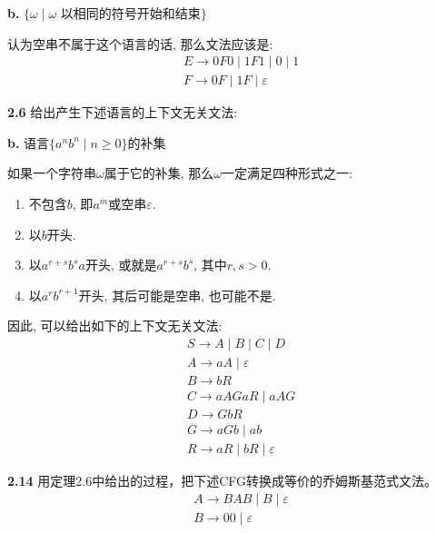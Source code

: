 \documentclass[UTF8]{report}
\newcommand{\problem}[1]{{\setlength{\parskip}{10pt}\noindent \bf{#1}}}
\newenvironment{solution}{{\noindent\hskip 2em \bf 解 \quad}}{}
\begin{document}
\problem{b.} $\{ \omega \mid \omega\text{ 以相同的符号开始和结束}\}$

\begin{solution}
    认为空串不属于这个语言的话, 那么文法应该是:
    \begin{align*}
        &E \rightarrow 0F0       \mid 1F1 \mid 0 \mid 1\\
        &F \rightarrow 0F \mid 1F \mid \varepsilon
    \end{align*}
\end{solution}

\problem{2.6} 给出产生下述语言的上下文无关文法:

\problem{b.} 语言$\{a^n b^n \mid n\geq 0\}$的补集

\begin{solution}
    如果一个字符串$\omega$属于它的补集, 那么$\omega$一定满足四种形式之一:
    \begin{enumerate}
        \item 不包含$b$, 即$a^m$或空串$\varepsilon$.
        \item 以$b$开头.
        \item 以$a^{r+s}b^sa$开头, 或就是$a^{r+s}b^s$, 其中$r,s>0$.
        \item 以$a^rb^{r+1}$开头, 其后可能是空串, 也可能不是.
    \end{enumerate}
    因此, 可以给出如下的上下文无关文法:
    \begin{align*}
        &S \rightarrow A\mid B\mid C\mid D\\
        &A \rightarrow aA \mid \varepsilon\\
        &B \rightarrow bR\\
        &C \rightarrow aAGaR \mid aAG\\
        &D \rightarrow GbR\\
        &G \rightarrow aGb \mid ab\\
        &R \rightarrow aR \mid bR \mid \varepsilon
    \end{align*}
\end{solution}


\problem{2.14} 用定理2.6中给出的过程，把下述CFG转换成等价的乔姆斯基范式文法。
\begin{align*}
    &A \rightarrow BAB \mid B \mid \varepsilon\\
    &B \rightarrow 00 \mid \varepsilon
\end{align*}
\end{document}
